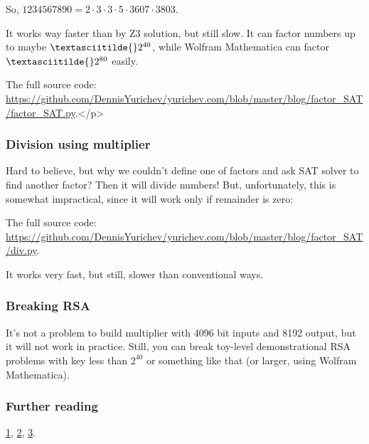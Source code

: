 So, $1234567890 = 2 \cdot 3 \cdot 3 \cdot 5 \cdot 3607 \cdot 3803$.

It works way faster than by Z3 solution, but still slow.
It can factor numbers up to maybe $\textasciitilde{}2^{40}$, while Wolfram Mathematica can factor
$\textasciitilde{}2^{80}$ easily.

The full source code: \url{https://github.com/DennisYurichev/yurichev.com/blob/master/blog/factor_SAT/factor_SAT.py}.</p>

\subsubsection{Division using multiplier}

Hard to believe, but why we couldn't define one of factors and ask SAT solver to find another factor?
Then it will divide numbers!
But, unfortunately, this is somewhat impractical, since it will work only if remainder is zero:



The full source code: \url{https://github.com/DennisYurichev/yurichev.com/blob/master/blog/factor_SAT/div.py}.

It works very fast, but still, slower than conventional ways.

\subsubsection{Breaking \ac{RSA}}

It's not a problem to build multiplier with 4096 bit inputs and 8192 output, but it will not work in practice.
Still, you can break toy-level demonstrational RSA problems with key less than $2^{40}$ or something like that
(or larger, using Wolfram Mathematica).

\subsubsection{Further reading}

\href{https://yurichev.com/mirrors/SAT_factor/Encoding%20Basic%20Arithmetic%20Operations%20for%20SAT-Solvers.pdf}{1},
\href{https://yurichev.com/mirrors/SAT_factor/Factoring%20integers%20with%20parallel%20SAT%20solvers.pdf}{2},
\href{https://yurichev.com/mirrors/SAT_factor/Hard%20Instance%20Generation%20for%20SAT.pdf}{3}.

